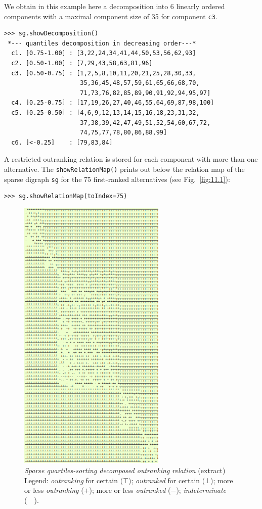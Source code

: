 We obtain in this example here a decomposition into 6 linearly ordered components with a maximal component size of 35 for component \texttt{c3}.

\begin{lstlisting}[caption={The 6 components of a sparse outranking digraph},label=list:11.4]
>>> sg.showDecomposition()
 *--- quantiles decomposition in decreasing order---*
  c1. ]0.75-1.00] : [3,22,24,34,41,44,50,53,56,62,93]
  c2. ]0.50-1.00] : [7,29,43,58,63,81,96]
  c3. ]0.50-0.75] : [1,2,5,8,10,11,20,21,25,28,30,33,
                     35,36,45,48,57,59,61,65,66,68,70,
                     71,73,76,82,85,89,90,91,92,94,95,97]
  c4. ]0.25-0.75] : [17,19,26,27,40,46,55,64,69,87,98,100]
  c5. ]0.25-0.50] : [4,6,9,12,13,14,15,16,18,23,31,32,
                     37,38,39,42,47,49,51,52,54,60,67,72,
                     74,75,77,78,80,86,88,99]
  c6. ]<-0.25]    : [79,83,84]
\end{lstlisting}

A restricted outranking relation is stored for each component with more than one alternative. The \texttt{showRelationMap()} prints out below the relation map of the sparse digraph \texttt{sg} for the 75 first-ranked alternatives (see Fig.~\vref{fig:11.1}):
\begin{lstlisting}
>>> sg.showRelationMap(toIndex=75)
\end{lstlisting}  
\begin{figure}[ht]
\sidecaption[t]
\includegraphics[width=7cm]{Figures/11-1-sparseRelationMap.png}
\caption[Sparse quartiles-sorting decomposed outranking relation]{\emph{Sparse quartiles-sorting decomposed outranking relation} (extract)\\ Legend: \emph{outranking} for certain ($\top$); \emph{outranked} for certain ($\bot$); more or less \emph{outranking} ($+$); more or less \emph{outranked} ($-$); \emph{indeterminate} (\ \ ).}
\label{fig:11.1}       %
\end{figure}

